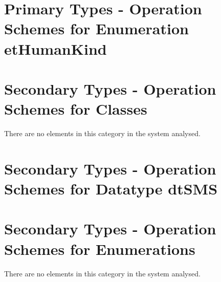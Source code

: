 \section{Primary Types - Operation Schemes for Enumeration etHumanKind} 
\label{OM-CM-PTEnumType-etHumanKind}






\section{Secondary Types - Operation Schemes for Classes}
There are no elements in this category in the system analysed.






\section{Secondary Types - Operation Schemes for Datatype dtSMS} 
\label{OM-CM-STDataType-dtSMS}



\section{Secondary Types - Operation Schemes for Enumerations}
There are no elements in this category in the system analysed.


